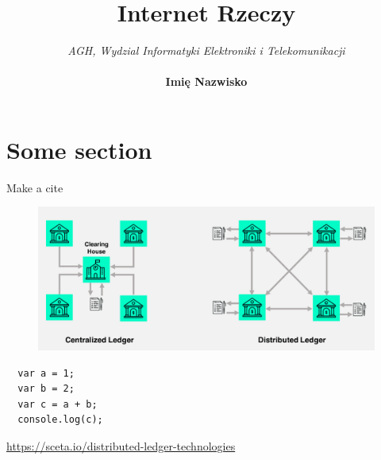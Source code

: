 \documentclass[12pt]{article}
\newenvironment{centerfig}
{\begin{figure}[H]\centering}
{\end{figure}}
\begin{document}
\title{Internet Rzeczy}
\author{
  \textit{AGH, Wydzial Informatyki Elektroniki i Telekomunikacji} \\ \\
  \textbf{Imię Nazwisko}\\
}
\date{ }
\maketitle
\tableofcontents

\newpage

\section{Some section}
Make a cite \cite{sceta}


\begin{centerfig}
  \includegraphics[width=\textwidth]{1.png}
\end{centerfig}

\begin{lstlisting}
  var a = 1;
  var b = 2;
  var c = a + b;
  console.log(c);
\end{lstlisting}

\begin{thebibliography}{9}
  \url{https://sceta.io/distributed-ledger-technologies}
 
\end{thebibliography}
\end{document}
